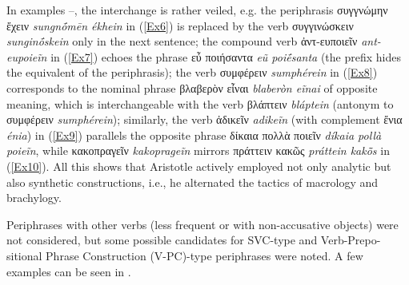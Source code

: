 \documentclass[output=paper,colorlinks,citecolor=brown]{langscibook}
\begin{document}
In examples --, the interchange is rather veiled, e.g. the periphrasis συγγνώμην ἔχειν \textit{sungnṓmēn ékhein} in (\ref{Ex6}) is replaced by the verb συγγινώσκειν \textit{sunginṓskein} only in the next sentence; the compound verb ἀντ-ευποιεῖν \textit{ant-eupoieĩn} in (\ref{Ex7}) echoes the phrase εὖ ποιήσαντα \textit{eũ poiḗsanta} (the prefix hides the equivalent of the periphrasis); the verb συμφέρειν \textit{sumphérein} in (\ref{Ex8}) corresponds to the nominal phrase βλαβερὸν εἶναι \textit{blaberòn eĩnai} of opposite meaning, which is interchangeable with the verb βλάπτειν \textit{bláptein} (antonym to συμφέρειν \textit{sumphérein}); similarly, the verb ἀδικεῖν \textit{adikeĩn} (with complement ἔνια \textit{énia}) in (\ref{Ex9}) parallels the opposite phrase δίκαια πολλὰ ποιεῖν \textit{díkaia pollà poieĩn}, while κακοπραγεῖν \textit{kakoprageĩn} mirrors πράττειν κακῶς \textit{práttein kakō̃s} in (\ref{Ex10}). All this shows that Aristotle actively employed not only analytic but also synthetic constructions, i.e., he alternated the tactics of macrology and brachylogy.

Periphrases with other verbs (less frequent or with non-accusative objects) were not considered, but some possible candidates for SVC-type and Verb-Prepo-sitional Phrase Construction (V-PC)-type periphrases were noted. A few examples can be seen in . %



\end{document}
